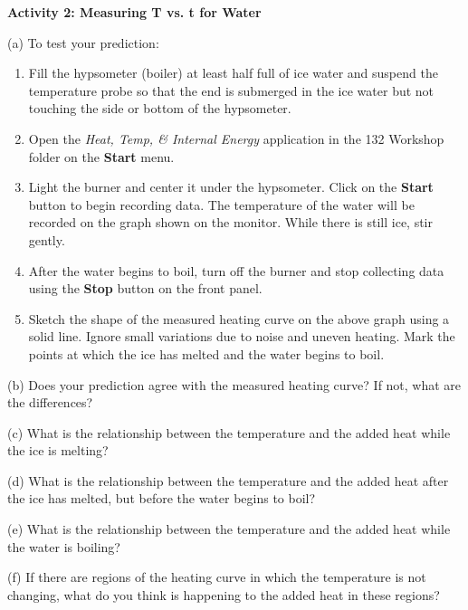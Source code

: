 \textbf{Activity 2: Measuring T vs. t for Water} 

(a) To test your prediction: 

\begin{enumerate}
\item Fill the hypsometer (boiler) at least half full of ice water and suspend
the temperature probe so that the end is submerged in the ice water
but not touching the side or bottom of the hypsometer. 
\item Open the \textit{Heat, Temp, \& Internal Energy} application in the
132 Workshop folder on the {\bf Start} menu.
\item Light the burner and center it under the hypsometer. Click on the
\textbf{Start} button to begin recording data. The temperature of
the water will be recorded on the graph shown on the monitor. While
there is still ice, stir gently. 
\item After the water begins to boil, turn off the burner and stop collecting
data using the \textbf{Stop} button on the front panel. 
\item Sketch the shape of the measured heating curve on the above graph
using a solid line. Ignore small variations due to noise and uneven
heating. Mark the points at which the ice has melted and the water
begins to boil.
\end{enumerate}
(b) Does your prediction agree with the measured heating curve? If
not, what are the differences?
\vspace{20mm}

(c) What is the relationship between the temperature and the added
heat while the ice is melting?
\vspace{20mm}

(d) What is the relationship between the temperature and the added
heat after the ice has melted, but before the water begins to boil?
\vspace{20mm}

(e) What is the relationship between the temperature and the added
heat while the water is boiling?
\vspace{20mm}

(f) If there are regions of the heating curve in which the temperature
is not changing, what do you think is happening to the added heat
in these regions?\vspace{20mm}

